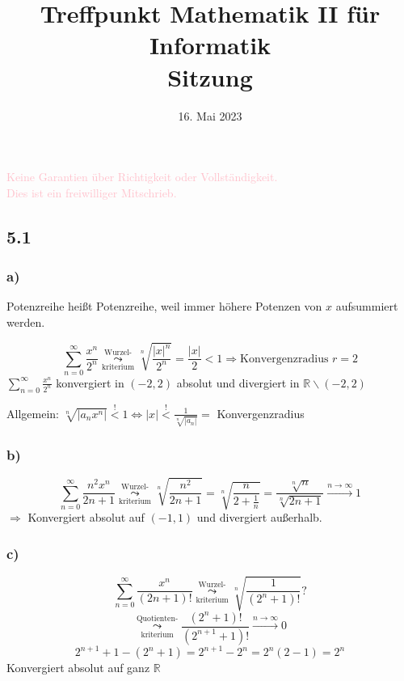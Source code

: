 \documentclass[
    accentcolor=pink,
    boxarc,
    dark_mode,
    logofile=enmpty
]{rubos-tuda-template}
\date{16. Mai 2023}
\title[trans rights <3]{Treffpunkt Mathematik II für Informatik \\ Sitzung \getSheetnumber{}}
\begin{document}
    \maketitle{}
    \begin{anmerkung}
        \huge{\textcolor{pink}{Keine Garantien über Richtigkeit oder Vollständigkeit. \\ Dies ist ein freiwilliger Mitschrieb.}}
    \end{anmerkung}
    \subsection*{5.1}
    \subsubsection*{a)}

    \begin{anmerkung}
        Potenzreihe heißt Potenzreihe, weil immer höhere Potenzen von $x$ aufsummiert werden.
    \end{anmerkung}
    \[\sum_{n = 0}^{\infty} \frac{x^n}{2^n} \underset{\text{kriterium}}{\overset{\text{Wurzel-}}{\leadsto}} \sqrt[n]{\frac{|x|^n}{2^n}} = \frac{|x|}{2} < 1 \Rightarrow \text{Konvergenzradius } r = 2\]
    \(\displaystyle{\sum_{n = 0}^{\infty} \frac{x^n}{2^n}}\) konvergiert in $(-2, 2)$ absolut und divergiert in $\mathbb{R}\backslash(-2,2)$

    Allgemein: \(\sqrt[n]{|a_n x^n|} \overset{!}{<} 1 \Leftrightarrow |x| \overset{!}{<} \frac{1}{\sqrt[n]{|a_n|}} =\) Konvergenzradius

    \subsubsection*{b)}
    \[\sum_{n = 0}^{\infty} \frac{n^2 x^n}{2n+1} \underset{\text{kriterium}}{\overset{\text{Wurzel-}}{\leadsto}} \sqrt[n]{\frac{n^2}{2n+1}} = \sqrt[n]{\frac{n}{2+\frac{1}{n}}} = \frac{\sqrt[n]{n}}{\sqrt[n]{2n+1}} \overset{n \to \infty}{\longrightarrow} 1\]
    $\Rightarrow$ Konvergiert absolut auf $(-1,1)$ und divergiert außerhalb.

    \subsubsection*{c)}
    \[\sum_{n = 0}^{\infty} \frac{x^n}{(2n+1)!} \underset{\text{kriterium}}{\overset{\text{Wurzel-}}{\leadsto}} \sqrt[n]{\frac{1}{(2^n+1)!}} ?\]
    \[\underset{\text{kriterium}}{\overset{\text{Quotienten-}}{\leadsto}} \frac{(2^n+1)!}{(2^{n+1}+1)!} \overset{n \to \infty}{\longrightarrow} 0\]
    \[2^{n+1}+1 -(2^n+1) = 2^{n+1}-2^n = 2^n(2-1) = 2^n\]
    Konvergiert absolut auf ganz $\mathbb{R}$
\end{document}
